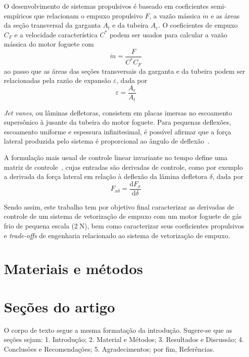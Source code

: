 \documentclass[
	article,			%
	10pt,				%
	oneside,			%
	a4paper,			%
  twocolumn,			%
	english,			%
	brazil,				%
	sumario=tradicional,
	]{abntex2}
\begin{document}
O desenvolvimento de sistemas propulsivos é baseado em coeficientes semi-empíricos que relacionam o empuxo propulsivo \(F\), a vazão mássica \(\dot{m}\) e as áreas da seção transversal da garganta \(A_t\) e da tubeira \(A_e\). O coeficientes de empuxo \(C_F\) e a velocidade característica \(C^*\) podem ser usados para calcular a vazão mássica do motor foguete com~\cite{Sutton}
\begin{equation}
  \label{eq:mass_flow}
  \dot{m} = \frac{F}{C^* C_F}
\end{equation}
ao passo que as áreas das seções transversais da garganta e da tubeira podem ser relacionadas pela razão de expansão \(\varepsilon\), dada por
\begin{equation}
  \varepsilon = \frac{A_e}{A_t}\label{eq:exp_ratio}
\end{equation} 

\textit{Jet vanes}, ou lâminas defletoras, consistem em placas imersas no escoamento supersônico à jusante da tubeira do motor foguete. Para pequenas deflexões, escoamento uniforme e espessura infinitesimal, é possível afirmar que a força lateral produzida pelo sistema é proporcional ao ângulo de deflexão~\cite{anderson}. 

A formulação mais usual de controle linear invariante no tempo define uma matriz de controle~\cite{fbsys}, cujas entradas são derivadas de controle, como por exemplo a derivada da força lateral em relação à deflexão da lâmina defletora \(\delta \), dada por
\begin{equation}
  F_{x\delta} = \frac{\mathrm{d} F_x}{\mathrm{d} \delta}\label{eq:control_derivative}
\end{equation}

Sendo assim, este trabalho tem por objetivo final caracterizar as derivadas de controle de um sistema de vetorização de empuxo com um motor foguete de gás frio de pequena escala (\(2\;\mathrm{N}\)), bem como caracterizar seus coeficientes propulsivos e \textit{trade-offs} de engenharia relacionado ao sistema de vetorização de empuxo.

\section{Materiais e métodos}


\section{Seções do artigo}

O corpo de texto segue a mesma formatação da introdução. Sugere-se que as seções sejam: 1.
Introdução; 2. Material e Métodos; 3. Resultados e Discussão; 4. Conclusões e
Recomendações; 5. Agradecimentos; por fim, Referências.
\end{document}
